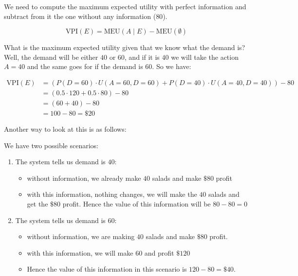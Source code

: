 

We need to compute the maximum expected utility with perfect information and subtract from it the one without any information ($80$).

\[
\text{VPI}(E) = \text{MEU}(A \mid E) - \text{MEU}(\emptyset)
\]

What is the maximum expected utility given that we know what the demand is? Well, the demand will be either $40$ or $60$, and if it is $40$ we will take the action $A=40$ and the same goes for if the demand is $60$. So we have:

\begin{align*}
\text{VPI}(E) &= \left(P(D=60) \cdot U(A=60, D=60) + P(D=40) \cdot U(A=40, D=40)\right) - 80 \\
&= \left( 0.5 \cdot 120 + 0.5 \cdot 80 \right) - 80 \\
&= \left( 60 + 40 \right) - 80 \\
&= 100  - 80 = \$20
\end{align*}


Another way to look at this is as follows:

We have two possible scenarios: 
\begin{enumerate}
    \item The system tells us demand is $40$:
    \begin{itemize}
        \item without information, we already make $40$ salads and make $\$80$ profit
        \item with this information, nothing changes, we will make the $40$ salads and get the $\$80$ profit. Hence the value of this information will be $80 - 80 = 0$
    \end{itemize}
    \item The system tells us demand is $60$:
    \begin{itemize}
        \item without information, we are making $40$ salads and make $\$80$ profit.
        \item with this information, we will make $60$ and profit $\$120$
        \item Hence the value of this information in this scenario is $120 - 80 = \$40$.
    \end{itemize}
\end{enumerate}


